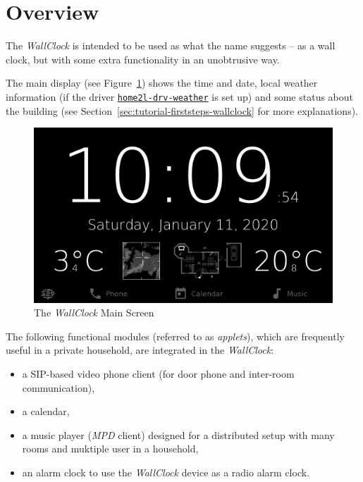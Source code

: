 \documentclass[12pt,english,parskip=half,headheight=19pt]{scrreprt}
\newcommand{\idx}[1]{#1\index{#1}}
\newcommand{\reftool}[1]{\hyperref[tool:#1]{\texttt{\idx{#1}}}}
\begin{document}
\section{Overview}
\label{sec:wallclock-overview}


The \textit{WallClock} is intended to be used as what the name suggests -- as a wall clock, but with some extra functionality in an unobtrusive way.

The main display (see Figure~\ref{fig:screen-wallclock-home}) shows the time and date, local weather information (if the driver \reftool{home2l-drv-weather} is set up) and some status about the building
(see Section~\ref{sec:tutorial-firststeps-wallclock} for more explanations).


\begin{figure}[ht]
  \centering
  \includegraphics[width=0.7\linewidth]{figs/wallclock-home-2.png}
  \caption[l]{The \textit{WallClock} Main Screen}
  \label{fig:screen-wallclock-home}
\end{figure}


The following functional modules (referred to as \textit{applets}), which are frequently useful in a private household, are integrated in the \textit{WallClock}:

\begin{itemize}
\item
  a SIP-based video phone client (for door phone and inter-room communication),
\item
  a calendar,
\item
  a music player (\textit{MPD} client) designed for a distributed
  setup with many rooms and muktiple user in a household,
\item
  an alarm clock to use the \textit{WallClock} device as a radio alarm clock.
\end{itemize}
\end{document}
